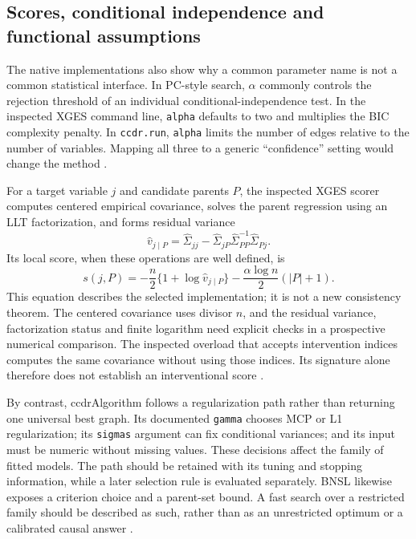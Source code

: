 \subsection{Scores, conditional independence and functional assumptions}

The native implementations also show why a common parameter name is not a
common statistical interface. In PC-style search, \(\alpha\) commonly controls
the rejection threshold of an individual conditional-independence test. In
the inspected XGES command line, \texttt{alpha} defaults to two and multiplies
the BIC complexity penalty. In \texttt{ccdr.run}, \texttt{alpha} limits the
number of edges relative to the number of variables. Mapping all three to a
generic ``confidence'' setting would change the method
\citep{exec13_cxx_agrum,exec13_cxx_xges,exec13_cxx_ccdr}.

For a target variable \(j\) and candidate parents \(P\), the inspected XGES
scorer computes centered empirical covariance, solves the parent regression
using an LLT factorization, and forms residual variance
\[
 \widehat v_{j\mid P}
 =\widehat\Sigma_{jj}
  -\widehat\Sigma_{jP}\widehat\Sigma_{PP}^{-1}\widehat\Sigma_{Pj}.
\]
Its local score, when these operations are well defined, is
\begin{equation}
 s(j,P)=-\frac n2\{1+\log\widehat v_{j\mid P}\}
        -\frac{\alpha\log n}{2}(|P|+1).
 \label{exec13:cxx-bic}
\end{equation}
This equation describes the selected implementation; it is not a new
consistency theorem. The centered covariance uses divisor \(n\), and the
residual variance, factorization status and finite logarithm need explicit
checks in a prospective numerical comparison. The inspected overload that
accepts intervention indices computes the same covariance without using
those indices. Its signature alone therefore does not establish an
interventional score \citep{exec13_cxx_xges}.

By contrast, ccdrAlgorithm follows a regularization path rather than returning
one universal best graph. Its documented \texttt{gamma} chooses MCP or L1
regularization; its \texttt{sigmas} argument can fix conditional variances;
and its input must be numeric without missing values. These decisions affect
the family of fitted models. The path should be retained with its tuning and
stopping information, while a later selection rule is evaluated separately.
BNSL likewise exposes a criterion choice and a parent-set bound. A fast
search over a restricted family should be described as such, rather than
as an unrestricted optimum or a calibrated causal answer
\citep{exec13_cxx_ccdr,exec13_cxx_bnsl}.

